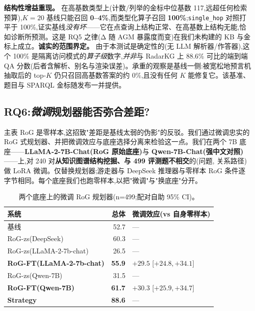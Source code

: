 \documentclass[11pt,a4paper]{article}
\newcommand{\qtype}[1]{\texttt{\small #1}}
\begin{document}
\textbf{结构性增益重现。} 在高基数类型上(计数/列举的金标中位基数 117,远超任何检索预算),$K{=}20$ 基线只能召回 \textbf{0--4\%},而类型化算子召回 \textbf{100\%};\qtype{single\_hop} 对照打平于 100\%,证实基线\emph{没有坏}——它在点查询上结构正常、在高基数上结构无能,恰如诊断所预测。这是 RQ5 之律(Δ 随 AGM 暴露度而变)在我们未构建的 KB 与金标上成立。\textbf{诚实的范围界定。} 由于本测试是确定性的(无 LLM 解析器/作答器),这个 100\% 是隔离访问模式的\emph{算子级}数字,\emph{并非}与 RadarKG 上 88.6\% 可比的端到端 QA 分数(后者含解析、别名与渲染误差)。承重的观察是基线一侧:被宽松地预言机抽取后的 top-$K$ 仍只召回高基数答案的约 0\%,且没有任何 $K$ 能修复它。该基准、题目与 SPARQL 金标随发布一并提供。

\subsection{RQ6:\emph{微调}规划器能否弥合差距?}
\label{sec:rq6}

主表 RoG 是零样本,这招致"差距是基线太弱的伪影"的反驳。我们通过微调忠实的 RoG 式规划器、并把微调效应与底座选择分离来检验这一点。我们在两个 7B 底座——\textbf{LLaMA-2-7B-Chat(RoG 原始底座)}与 \textbf{Qwen-7B-Chat(强中文对照)}——上,对 240 对\textbf{从知识图谱结构挖掘、与 499 评测题不相交}的(问题, 关系路径)做 LoRA 微调。仅替换规划器;游走器与 DeepSeek 推理器与零样本 RoG 条件逐字节相同。每个底座我们也跑零样本,以把"微调"与"换底座"分开。

\begin{table}[h]
\centering\small
\caption{两个底座上的微调 RoG 规划器(n=499;配对自助 95\% CI)。}
\label{tab:rogft}
\begin{tabular}{l r l}
\toprule
\textbf{系统} & \textbf{总体} & \textbf{微调效应(vs 自身零样本)} \\
\midrule
基线                  & 52.7 & --- \\
RoG-zs(DeepSeek)         & 60.3 & --- \\
RoG-zs(LLaMA-2-7b-chat)  & 26.5 & --- \\
\textbf{RoG-FT(LLaMA-2-7b-chat)} & \textbf{55.9} & $\mathbf{+29.5}$ [$+24.8,+34.1$] \\
RoG-zs(Qwen-7B)          & 31.5 & --- \\
\textbf{RoG-FT(Qwen-7B)} & \textbf{61.7} & $\mathbf{+30.3}$ [$+25.9,+34.7$] \\
\textbf{Strategy}        & \textbf{88.6} & --- \\
\bottomrule
\end{tabular}
\end{table}
\end{document}

